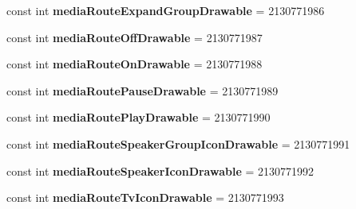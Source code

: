 \begin{DoxyCompactItemize}
\item 
\mbox{\label{class_pinned_app_1_1_droid_1_1_resource_1_1_attribute_a07be8f77ebc675c57232523f87f65bbc}} 
const int {\bfseries media\+Route\+Expand\+Group\+Drawable} = 2130771986
\item 
\mbox{\label{class_pinned_app_1_1_droid_1_1_resource_1_1_attribute_a1e0afb73fad77daf27b366f2715ff6fd}} 
const int {\bfseries media\+Route\+Off\+Drawable} = 2130771987
\item 
\mbox{\label{class_pinned_app_1_1_droid_1_1_resource_1_1_attribute_a2c14158fbf30854e0f252a3a7c2f8068}} 
const int {\bfseries media\+Route\+On\+Drawable} = 2130771988
\item 
\mbox{\label{class_pinned_app_1_1_droid_1_1_resource_1_1_attribute_af3dded6b2a521750069730ef0f1835a1}} 
const int {\bfseries media\+Route\+Pause\+Drawable} = 2130771989
\item 
\mbox{\label{class_pinned_app_1_1_droid_1_1_resource_1_1_attribute_a5fc9c152e4e1f741cf6193ca791a4a78}} 
const int {\bfseries media\+Route\+Play\+Drawable} = 2130771990
\item 
\mbox{\label{class_pinned_app_1_1_droid_1_1_resource_1_1_attribute_a52ca4a5bb1254955b3c77101b6b60456}} 
const int {\bfseries media\+Route\+Speaker\+Group\+Icon\+Drawable} = 2130771991
\item 
\mbox{\label{class_pinned_app_1_1_droid_1_1_resource_1_1_attribute_afbd40a8e5b54a03711cacff13808c3d3}} 
const int {\bfseries media\+Route\+Speaker\+Icon\+Drawable} = 2130771992
\item 
\mbox{\label{class_pinned_app_1_1_droid_1_1_resource_1_1_attribute_ab956ee6314e4a1cca86f1513e08efc37}} 
const int {\bfseries media\+Route\+Tv\+Icon\+Drawable} = 2130771993
\item 

\end{DoxyCompactItemize}
